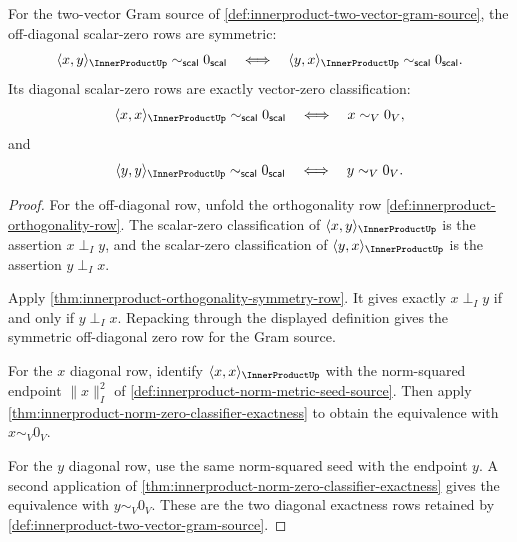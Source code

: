 \begin{theorem}
\label{thm:innerproduct-gram-symmetry-zero-exactness}
For the two-vector Gram source of
\autoref{def:innerproduct-two-vector-gram-source}, the off-diagonal
scalar-zero rows are symmetric:
$$
\langle x,y\rangle_{\InnerProductUp}\sim_{\mathsf{scal}}0_{\mathsf{scal}}
\quad\Longleftrightarrow\quad
\langle y,x\rangle_{\InnerProductUp}\sim_{\mathsf{scal}}0_{\mathsf{scal}}.
$$
Its diagonal scalar-zero rows are exactly vector-zero classification:
$$
\langle x,x\rangle_{\InnerProductUp}\sim_{\mathsf{scal}}0_{\mathsf{scal}}
\quad\Longleftrightarrow\quad
x\sim_V 0_V,
$$
and
$$
\langle y,y\rangle_{\InnerProductUp}\sim_{\mathsf{scal}}0_{\mathsf{scal}}
\quad\Longleftrightarrow\quad
y\sim_V 0_V.
$$
\end{theorem}
\begin{proof}
For the off-diagonal row, unfold the orthogonality row
\autoref{def:innerproduct-orthogonality-row}. The scalar-zero classification
of $\langle x,y\rangle_{\InnerProductUp}$ is the assertion $x\perp_I y$, and
the scalar-zero classification of $\langle y,x\rangle_{\InnerProductUp}$ is
the assertion $y\perp_I x$.

Apply \autoref{thm:innerproduct-orthogonality-symmetry-row}. It gives exactly
$x\perp_I y$ if and only if $y\perp_I x$. Repacking through the displayed
definition gives the symmetric off-diagonal zero row for the Gram source.

For the $x$ diagonal row, identify
$\langle x,x\rangle_{\InnerProductUp}$ with the norm-squared endpoint
$\|x\|_{I}^{2}$ of \autoref{def:innerproduct-norm-metric-seed-source}. Then
apply \autoref{thm:innerproduct-norm-zero-classifier-exactness} to obtain the
equivalence with $x\sim_V 0_V$.

For the $y$ diagonal row, use the same norm-squared seed with the endpoint
$y$. A second application of
\autoref{thm:innerproduct-norm-zero-classifier-exactness} gives the
equivalence with $y\sim_V 0_V$. These are the two diagonal exactness rows
retained by \autoref{def:innerproduct-two-vector-gram-source}.
\end{proof}

